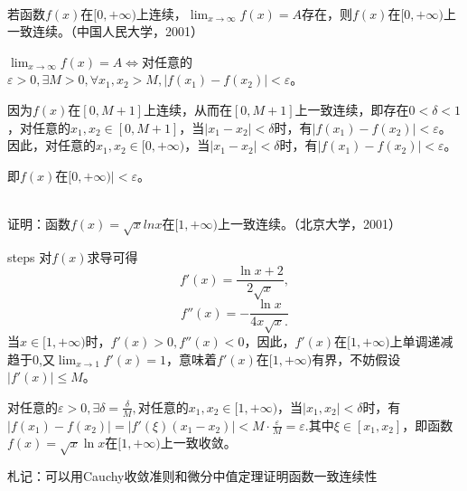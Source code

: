  \begin{example}
  \hfill\\
  
  若函数$f(x)$在$[0,+\infty)$上连续，$\displaystyle\lim_{x\rightarrow\infty}f(x)=A$存在，则$f(x)$在$[0,+\infty)$上一致连续。（中国人民大学，2001）
 
  $\lim_{x\rightarrow\infty}f(x)=A\Leftrightarrow$对任意的$\varepsilon>0,\exists M>0,\forall x_1,x_2>M,|f(x_1)-f(x_2)|<\varepsilon$。
  
  因为$f(x)$在$[0,M+1]$上连续，从而在$[0,M+1]$上一致连续，即存在$0<\delta<1$，对任意的$x_1,x_2\in[0,M+1]$，当$|x_1-x_2|<\delta$时，有$|f(x_1)-f(x_2)|<\varepsilon$。因此，对任意的$x_1,x_2\in[0,+\infty)$，当$|x_1-x_2|<\delta$时，有$|f(x_1)-f(x_2)|<\varepsilon$。
  
  即$f(x)$在$[0,+\infty)|<\varepsilon$。
  \end{example}
  \begin{example}
  \hfill\\
  证明：函数$f(x)=\sqrt{x}lnx$在$[1,+\infty)$上一致连续。（北京大学，2001）
  
  steps
  对$f(x)$求导可得
  \[f'(x)=\frac{\ln x+2}{2\sqrt x},\]
  \[f''(x)=-\frac{\ln x}{4x\sqrt x.}\]
  当$x\in[1,+\infty)$时，$f'(x)>0,f''(x)<0$，因此，$f'(x)$在$[1,+\infty)$上单调递减趋于0,又$\lim_{x\rightarrow1}f'(x)=1$，意味着$f'(x)$在$[1,+\infty)$有界，不妨假设$|f'(x)|\leq M$。
  
  对任意的$\varepsilon>0,\exists\delta=\frac{\delta}M,$对任意的$x_1,x_2\in[1,+\infty)$，当$|x_1,x_2|<\delta$时，有$|f(x_1)-f(x_2)|=|f'(\xi)(x_1-x_2)|<M\cdot\frac{\varepsilon}{M}=\varepsilon.$其中$\xi\in[x_1,x_2]$，即函数$f(x)=\sqrt{x}\ln x$在$[1,+\infty)$上一致收敛。
  \end{example}

\begin{remark}
  札记：可以用Cauchy收敛准则和微分中值定理证明函数一致连续性
\end{remark}

